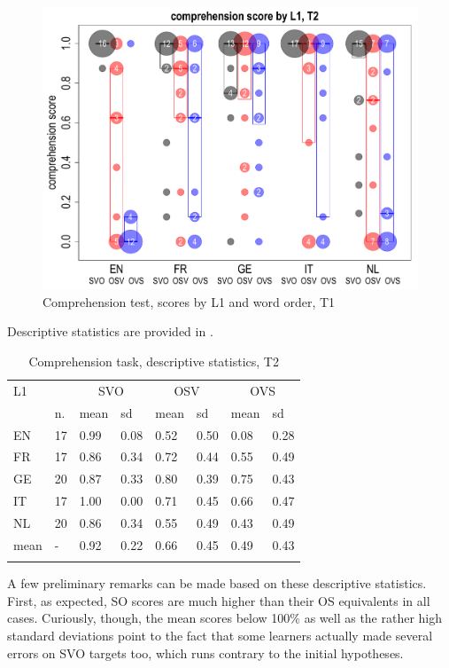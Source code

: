 \begin{figure}
    \includegraphics[width=\textwidth]{figures/05-2.pdf}
    \caption{Comprehension test, scores by L1 and word order, T1}
    \label{fig:05:2}
\end{figure}

Descriptive statistics are provided in .

\begin{table}
    \begin{tabularx}{\textwidth}{XXXXXXXX}
    \lsptoprule
    L1 &  & \multicolumn{2}{c}{SVO} & \multicolumn{2}{c}{OSV} & \multicolumn{2}{c}{OVS}\\
    & n. & mean & sd & mean & sd & mean & sd\\
    \cmidrule(lr){3-4}\cmidrule(lr){5-6}\cmidrule(lr){7-8}
    EN & 17 & 0.99 & 0.08 & 0.52 & 0.50 & 0.08 & 0.28\\
    FR & 17 & 0.86 & 0.34 & 0.72 & 0.44 & 0.55 & 0.49\\
    GE & 20 & 0.87 & 0.33 & 0.80 & 0.39 & 0.75 & 0.43\\
    IT & 17 & 1.00 & 0.00 & 0.71 & 0.45 & 0.66 & 0.47\\
    NL & 20 & 0.86 & 0.34 & 0.55 & 0.49 & 0.43 & 0.49\\
    mean & {}- & 0.92 & 0.22 & 0.66 & 0.45 & 0.49 & 0.43\\
    \lspbottomrule
    \end{tabularx}
    \caption{Comprehension task, descriptive statistics, T2}
    \label{tab:05:2}
\end{table}

A few preliminary remarks can be made based on these descriptive statistics. First, as expected, SO scores are much higher than their OS equivalents in all cases. Curiously, though, the mean scores below 100\% as well as the rather high standard deviations point to the fact that some learners actually made several errors on SVO targets too, which runs contrary to the initial hypotheses. 

